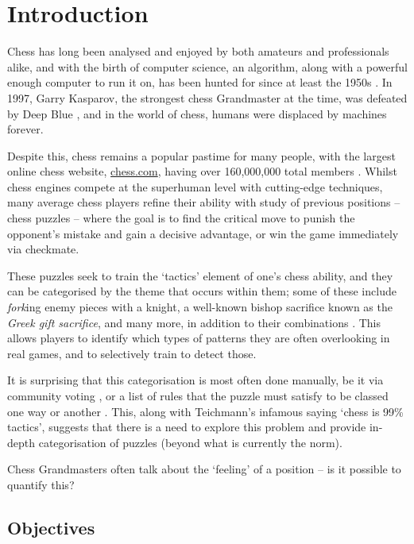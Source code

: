 \chapter{Introduction}

Chess has long been analysed and enjoyed by both amateurs and professionals
alike, and with the birth of computer science, an algorithm, along with a
powerful enough computer to run it on, has been hunted for since at least the
1950s \citep{shannon}. In 1997, Garry Kasparov, the strongest chess Grandmaster
at the time, was defeated by Deep Blue \citep{deepBlue}, and in the world of
chess, humans were displaced by machines forever. 

Despite this, chess remains a popular pastime for many people, with the largest
online chess website, \url{chess.com}, having over 160,000,000 total members
\citep{chesscomMembers}. Whilst chess engines compete at the superhuman level
with cutting-edge techniques, many average chess players refine their ability
with study of previous positions -- chess puzzles -- where the goal is to find
the critical move to punish the opponent's mistake and gain a decisive
advantage, or win the game immediately via checkmate. 

These puzzles seek to train the `tactics' element of one's chess ability, and
they can be categorised by the theme that occurs within them; some of these
include \emph{fork}ing enemy pieces with a knight, a well-known bishop
sacrifice known as the \emph{Greek gift sacrifice}, and many more, in addition
to their combinations \citep{chessPatterns}. This allows players to identify
which types of patterns they are often overlooking in real games, and to
selectively train to detect those. 

It is surprising that this categorisation is most often done manually, be it
via community voting \citep{lichessPuzzles}, or a list of rules that the puzzle
must satisfy to be classed one way or another \citep{lichessTagger}. This,
along with Teichmann's infamous saying `chess is 99\% tactics', suggests that
there is a need to explore this problem and provide in-depth categorisation of
puzzles (beyond what is currently the norm).

Chess Grandmasters often talk about the `feeling' of a position -- is it
possible to quantify this?

\section{Objectives}

